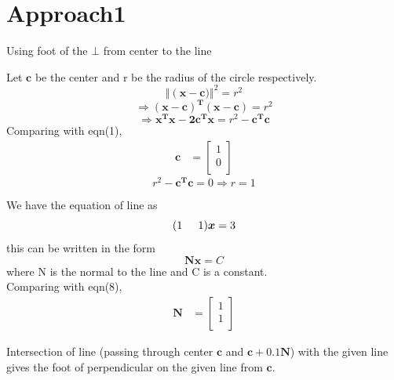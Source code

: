 \documentclass{beamer}
\begin{document}
\section{Approach1}
\begin{frame}{Using foot of the $\bot$ from center to the line}
\begin{solution}
Let $\boldsymbol{c}$ be the center and r be the radius of the circle respectively.
\begin{equation}
    \Vert\left(\boldsymbol{x - c}) \right\Vert^2 = r^2
\end{equation}
\begin{equation}
    \Rightarrow \boldsymbol{(x-c)^T(x-c)} = r^2
\end{equation}
\begin{equation}
    \Rightarrow \boldsymbol{x^Tx - 2c^Tx} = r^2 - \boldsymbol{c^Tc}
\end{equation}
Comparing with eqn(1),
\begin{align}
    \boldsymbol{c} &= \begin{bmatrix}
          1 \\
          0 \\
         \end{bmatrix}
\end{align}
\begin{equation}
    r^2 - \boldsymbol{c^Tc} = 0 \Rightarrow r = 1
\end{equation}  
\end{solution}
\end{frame}

\begin{frame}
\begin{solution}
We have the equation of line as
\begin{equation}
    (1\hspace{5mm} 1)\boldsymbol{x} = 3
\end{equation}
this can be written in the form
\begin{equation}
    \boldsymbol{Nx = } C
\end{equation}
where N is the normal to the line and C is a constant.\\
Comparing with eqn(8),\\
\begin{align}
    \boldsymbol{N} &= \begin{bmatrix}
          1 \\
          1 \\
         \end{bmatrix}
\end{align}

Intersection of line (passing through center $\boldsymbol{c}$ and $\boldsymbol{c + 0.1N}$) with the given line gives the foot of perpendicular on the given line from $\boldsymbol{c}$.\\
\end{solution}
\end{frame}
\end{document}
